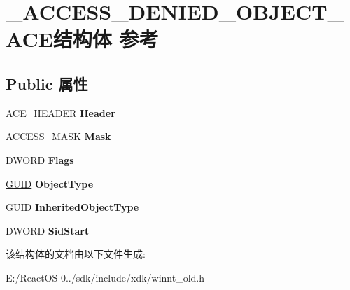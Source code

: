 \hypertarget{struct___a_c_c_e_s_s___d_e_n_i_e_d___o_b_j_e_c_t___a_c_e}{}\section{\+\_\+\+A\+C\+C\+E\+S\+S\+\_\+\+D\+E\+N\+I\+E\+D\+\_\+\+O\+B\+J\+E\+C\+T\+\_\+\+A\+C\+E结构体 参考}
\label{struct___a_c_c_e_s_s___d_e_n_i_e_d___o_b_j_e_c_t___a_c_e}
\subsection*{Public 属性}
\begin{DoxyCompactItemize}
\item 
\mbox{\label{struct___a_c_c_e_s_s___d_e_n_i_e_d___o_b_j_e_c_t___a_c_e_a96e5bcdaa4d5964278452075645c7975}} 
\hyperlink{struct___a_c_e___h_e_a_d_e_r}{A\+C\+E\+\_\+\+H\+E\+A\+D\+ER} {\bfseries Header}
\item 
\mbox{\label{struct___a_c_c_e_s_s___d_e_n_i_e_d___o_b_j_e_c_t___a_c_e_a1ad79902104b8fdde6a4a34114dd0486}} 
A\+C\+C\+E\+S\+S\+\_\+\+M\+A\+SK {\bfseries Mask}
\item 
\mbox{\label{struct___a_c_c_e_s_s___d_e_n_i_e_d___o_b_j_e_c_t___a_c_e_a967ba5c83a5c5313c7b0bab39c985a14}} 
D\+W\+O\+RD {\bfseries Flags}
\item 
\mbox{\label{struct___a_c_c_e_s_s___d_e_n_i_e_d___o_b_j_e_c_t___a_c_e_a4a06edd9b3cada10e8e87df8537117cc}} 
\hyperlink{interface_g_u_i_d}{G\+U\+ID} {\bfseries Object\+Type}
\item 
\mbox{\label{struct___a_c_c_e_s_s___d_e_n_i_e_d___o_b_j_e_c_t___a_c_e_a1e9f0f7877de7e9a5d8cab9e7965e94e}} 
\hyperlink{interface_g_u_i_d}{G\+U\+ID} {\bfseries Inherited\+Object\+Type}
\item 
\mbox{\label{struct___a_c_c_e_s_s___d_e_n_i_e_d___o_b_j_e_c_t___a_c_e_a4cc14ed2d1c69e13526076fe0f8a0ce7}} 
D\+W\+O\+RD {\bfseries Sid\+Start}
\end{DoxyCompactItemize}


该结构体的文档由以下文件生成\+:\begin{DoxyCompactItemize}
\item 
E\+:/\+React\+O\+S-\/0../sdk/include/xdk/winnt\+\_\+old.\+h\end{DoxyCompactItemize}
